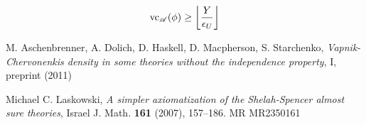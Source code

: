 \documentclass{amsart}
\renewcommand{\AA}{\mathscr A}
\providecommand{\floor}[1]{\left \lfloor #1 \right \rfloor }
\begin{document}
\begin{align*}
	\vc_\AA(\phi) \geq \floor{\frac{Y}{\epsilon_U}}
\end{align*}


\begin{thebibliography}{9}

	M. Aschenbrenner, A. Dolich, D. Haskell, D. Macpherson, S. Starchenko,
	\textit{Vapnik-Chervonenkis density in some theories without the independence property}, I, preprint (2011)
	
  Michael C. Laskowski, \textit{A simpler axiomatization of the Shelah-Spencer almost sure theories},
  Israel J. Math. \textbf{161} (2007), 157–186. MR MR2350161	

\end{thebibliography}
	
\end{document}
